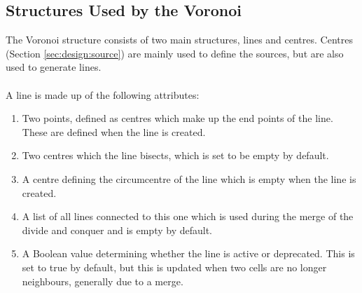 \subsection{Structures Used by the Voronoi}\label{sec:des:struct}
The Voronoi structure consists of two main structures, lines and centres. Centres (Section \ref{sec:design:source}) are mainly used to define the sources, but are also used to generate lines.
\\
\\
A line is made up of the following attributes:
\begin{enumerate}
\item Two points, defined as centres which make up the end points of the line. These are defined when the line is created.
\item Two centres which the line bisects, which is set to be empty by default.
\item A centre defining the circumcentre of the line which is empty when the line is created.
\item A list of all lines connected to this one which is used during the merge of the divide and conquer and is empty by default.
\item A Boolean value determining whether the line is active or deprecated. This is set to true by default, but this is updated when two cells are no longer neighbours, generally due to a merge.
\end{enumerate}

